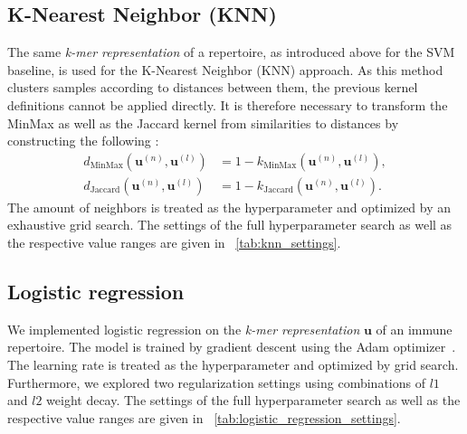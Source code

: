 \documentclass[oneside]{book}
\newcommand\Bu{\bm{u}}
\begin{document}
\subsection{K-Nearest Neighbor (KNN)}
The same \emph{k-mer representation} of a repertoire, as introduced above for the SVM baseline,
is used for the K-Nearest Neighbor (KNN) approach. As this method clusters samples 
according to distances between them, the previous kernel definitions cannot be applied 
directly. It is therefore necessary to transform the MinMax as well as the Jaccard 
kernel from similarities to distances by constructing 
the following \citep{levandowsky1971distance}:
%
\begin{equation}
    \begin{split}
        d_{\mathrm{MinMax}} (\Bu^{(n)},\Bu^{(l)}) &= 1 - k_{\mathrm{MinMax}} (\Bu^{(n)},\Bu^{(l)}), \\
        d_{\mathrm{Jaccard}} (\Bu^{(n)},\Bu^{(l)}) &= 1 - k_{\mathrm{Jaccard}} (\Bu^{(n)},\Bu^{(l)}).
    \end{split}
\end{equation}
The amount of neighbors is treated as the hyperparameter and optimized by an 
exhaustive grid search. The settings of the full hyperparameter search as well 
as the respective value ranges are given in \tablename~\ref{tab:knn_settings}.

\subsection{Logistic regression}
We implemented logistic regression on the \emph{k-mer 
representation} $\Bu$ of an immune repertoire. The model
is trained by gradient descent using the Adam optimizer~\citep{kingma2014adam}.
The learning rate is treated as the hyperparameter and optimized by grid search.
Furthermore, we explored two regularization settings 
using combinations of $l1$ and $l2$ weight decay.
The settings of the full hyperparameter search as well as the respective value ranges
are given in \tablename~\ref{tab:logistic_regression_settings}.
%
\end{document}
